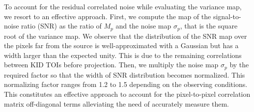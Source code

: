 {\lp To account for the residual
correlated noise while evaluating the variance map, we resort to an
effective approach.
First, we compute the map of the signal-to-noise ratio (SNR) as the ratio of
$M_p$ and the noise map $\sigma_p$, that is the square root of the
variance map. We observe that the distribution of the SNR map over the pixels far from the source is
well-approximated with a Gaussian but has a width larger than the
expected unity. This is due to the remaining correlations between KID TOIs
before projection. Then, we multiply the noise map 
$\sigma_p$ by the required factor so
that the width of SNR distribution becomes normalized.
This normalizing factor ranges from 1.2 to 1.5 depending on the observing conditions. This
constitutes an effective approach to account for the pixel-to-pixel
correlation matrix off-diagonal terms alleviating the need of
accurately measure them.}

%
%

